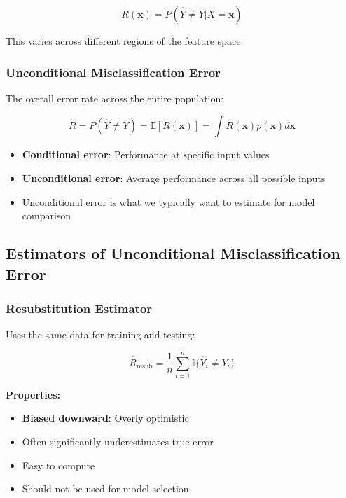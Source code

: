 \documentclass[12pt,a4paper]{article}
\begin{document}
\begin{equation}
R(\mathbf{x}) = P(\hat{Y} \neq Y | X = \mathbf{x})
\end{equation}

This varies across different regions of the feature space.

\subsubsection{Unconditional Misclassification Error}

The overall error rate across the entire population:

\begin{equation}
R = P(\hat{Y} \neq Y) = \mathbb{E}[R(\mathbf{x})] = \int R(\mathbf{x}) p(\mathbf{x}) d\mathbf{x}
\end{equation}

\begin{tcolorbox}[colback=yellow!5!white,colframe=orange!75!black,title=Key Difference]
\begin{itemize}
    \item \textbf{Conditional error}: Performance at specific input values
    \item \textbf{Unconditional error}: Average performance across all possible inputs
    \item Unconditional error is what we typically want to estimate for model comparison
\end{itemize}
\end{tcolorbox}

\subsection{Estimators of Unconditional Misclassification Error}

\subsubsection{Resubstitution Estimator}

Uses the same data for training and testing:

\begin{equation}
\hat{R}_{\text{resub}} = \frac{1}{n} \sum_{i=1}^n \mathbb{I}\{\hat{Y}_i \neq Y_i\}
\end{equation}

\textbf{Properties:}
\begin{itemize}
    \item \textbf{Biased downward}: Overly optimistic
    \item Often significantly underestimates true error
    \item Easy to compute
    \item Should not be used for model selection
\end{itemize}
\end{document}
